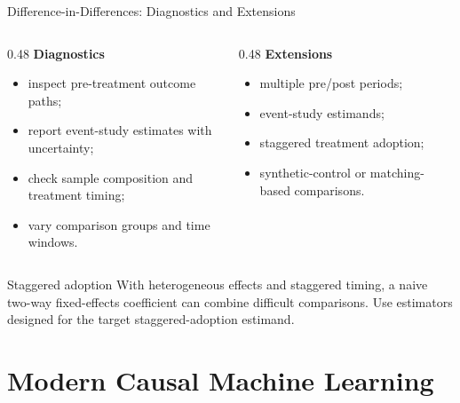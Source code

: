 \documentclass[aspectratio=169,11pt]{beamer}
\begin{document}
\begin{frame}{Difference-in-Differences: Diagnostics and Extensions}
\begin{columns}
\begin{column}{0.48\textwidth}
\textbf{Diagnostics}
\begin{itemize}
  \item inspect pre-treatment outcome paths;
  \item report event-study estimates with uncertainty;
  \item check sample composition and treatment timing;
  \item vary comparison groups and time windows.
\end{itemize}
\end{column}

\begin{column}{0.48\textwidth}
\textbf{Extensions}
\begin{itemize}
  \item multiple pre/post periods;
  \item event-study estimands;
  \item staggered treatment adoption;
  \item synthetic-control or matching-based comparisons.
\end{itemize}
\end{column}
\end{columns}

\begin{alertblock}{Staggered adoption}
With heterogeneous effects and staggered timing, a naive two-way fixed-effects coefficient can combine difficult comparisons. Use estimators designed for the target staggered-adoption estimand.
\end{alertblock}
\end{frame}

\section{Modern Causal Machine Learning}
\end{document}

